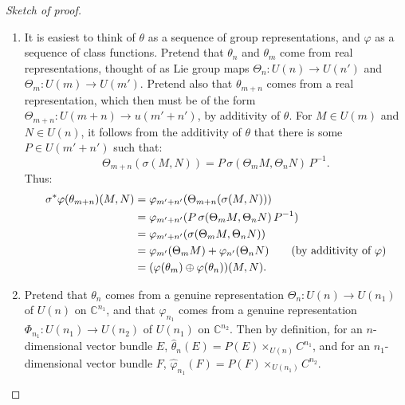 \documentclass{article}
\newcommand{\C}{\mathbb{C}}
\renewcommand{\to}{\longrightarrow}
\theoremstyle{definition}
\begin{document}
\begin{proof}[Sketch of proof]
\begin{enumerate}
\item It is easiest to think of $\theta$ as a sequence of group representations, and $\varphi$ as a sequence of class functions. Pretend that $\theta_n$ and $\theta_m$ come from real representations, thought of as Lie group maps $\Theta_n:U(n) \to U(n')$ and $\Theta_m:U(m)\to U(m')$. Pretend also that $\theta_{m+n}$ comes from a real representation, which then must be of the form $\Theta_{m+n}:U(m+n)\to u(m'+n')$, by additivity of $\theta$. For $M \in U(m)$ and $N \in U(n)$, it follows from the additivity of $\theta$ that there is some $P\in U(m'+n')$ such that:
\[\Theta_{m+n}(\sigma(M,N))=P\,\sigma(\Theta_mM,\Theta_nN)\,P^{-1}.\]
Thus:
\begin{align*}
\sigma^* \varphi(\theta_{m+n})(M, N) & = \varphi_{m'+n'} (\Theta_{m+n}(\sigma(M,N))) \\
& = \varphi_{m'+n'} (P\,\sigma(\Theta_mM,\Theta_nN)\,P^{-1}) \\
& = \varphi_{m'+n'} (\sigma(\Theta_mM,\Theta_nN)) \\
& = \varphi_{m'} (\Theta_m M) + \varphi_{n'} (\Theta_n N) \textup{\qquad(by additivity of $\varphi$)}\\
& = (\varphi(\theta_m) \oplus \varphi(\theta_n)) (M, N).
\end{align*}
%
%
\item Pretend that $\theta_{n}$ comes from a genuine representation $\Theta_n:U(n) \to U(n_1)$ of $U(n)$ on $\C^{n_1}$, and that $\varphi_{n_1}$ comes from a genuine representation $\Phi_{n_1}:U(n_1) \to U(n_2)$ of $U(n_1)$ on $\C^{n_2}$. Then by definition, for an $n$-dimensional vector bundle $E$, $\hat \theta_n(E) = P(E) \times_{U(n)} C^{n_1}$, and for an $n_1$-dimensional vector bundle $F$, $\hat \varphi_{n_1}(F) = P(F) \times_{U(n_1)} C^{n_2}$.


\end{enumerate}
\end{proof}
\end{document}
